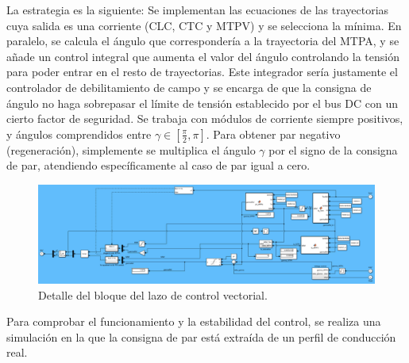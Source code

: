 La estrategia es la siguiente: Se implementan las ecuaciones de las trayectorias cuya salida es una corriente (CLC, CTC y MTPV) y se selecciona la mínima. En paralelo, se calcula el ángulo que correspondería a la trayectoria del MTPA, y se añade un control integral que aumenta el valor del ángulo controlando la tensión para poder entrar en el resto de trayectorias. Este integrador sería justamente el controlador de debilitamiento de campo y se encarga de que la consigna de ángulo no haga sobrepasar el límite de tensión establecido por el bus DC con un cierto factor de seguridad. Se trabaja con módulos de corriente siempre positivos, y ángulos comprendidos entre $\gamma \in [\frac{\pi}{2}, \pi]$. Para obtener par negativo (regeneración), simplemente se multiplica el ángulo $\gamma$ por el signo de la consigna de par, atendiendo específicamente al caso de par igual a cero.


\begin{figure}[H]
    \centering
    \includegraphics[width=1\linewidth]{fig/EMR_control.png}
    \caption{Detalle del bloque del lazo de control vectorial.}
    
\end{figure}
\newpage

Para comprobar el funcionamiento y la estabilidad del control, se realiza una simulación en la que la consigna de par está extraída de un perfil de conducción real.

